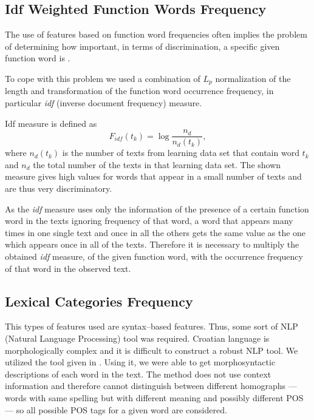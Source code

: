 \documentclass{llncs}
\begin{document}
\subsection{Idf Weighted Function Words Frequency}
\label{sec:funkcijske-rijeci-idf}

The use of features based on function word frequencies often implies the
problem of determining how important, in terms of discrimination, a
specific given function word is \cite{diederich2003authorship}.

To cope with this problem we used a combination of $L_p$ normalization of the
length and transformation of the function word occurrence frequency, in
particular \emph{idf} (inverse document frequency) measure.

Idf measure is defined as \cite{diederich2003authorship}
\begin{equation}
F_{idf}(t_k) = \log \frac{n_d}{n_d(t_k)},
\label{equ:idf}
\end{equation}
where $n_d(t_k)$ is the number of texts from learning data set that contain word
$t_k$ and $n_d$ the total number of the texts in that learning data set. The
shown measure gives high values for words that appear in a small number of
texts and are thus very discriminatory.

As the \emph{idf} measure uses only the information of the presence of a
certain function word in the texts ignoring frequency of that word, a word that appears
many times in one single text and once in all the others gets the same value as
the one which appears once in all of the texts. Therefore it is necessary to
multiply the obtained \emph{idf} measure, of the given function word, with the
occurrence frequency of that word in the observed text.

\subsection{Lexical Categories Frequency}
\label{sec:rijeci-grupe}
This types of features used are syntax--based features. Thus, some sort of NLP
(Natural Language Processing) tool was required. Croatian language is
morphologically complex and it is difficult to construct a robust NLP tool.
We utilized the tool given in \cite{snajder08automatic}. Using it, we were able to get
morphosyntactic descriptions of each word in the text. The method does not
use context information and therefore cannot distinguish between different
homographs --- words with same spelling but with different meaning and possibly
different POS --- so all possible POS tags for a given word are considered.
\end{document}
